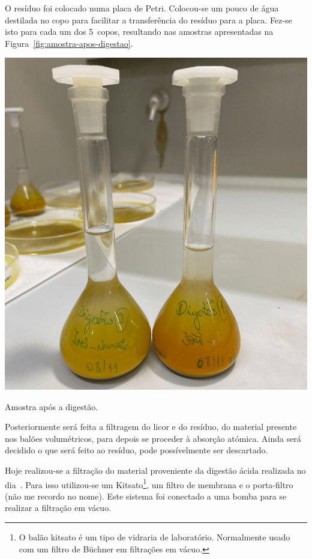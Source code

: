 O resíduo foi colocado numa placa de Petri.
Colocou-se um pouco de água destilada no copo para facilitar a transferência do resíduo para a placa.
Fez-se isto para cada um dos 5~copos, resultando nas amostras apresentadas na Figura~\ref{fig:amostra-apos-digestao}.

\begin{marginfigure}[-1\baselineskip]
    \centering
    \includegraphics[width=0.8\linewidth]{figures/Amostra após Digestão}
    \caption{Amostra após a digestão.}
    \label{fig:amostra-apos-digestao}
\end{marginfigure}

Posteriormente será feita a filtragem do licor e do resíduo, do material presente nos balões volumétricos, para depois se proceder à absorção atómica.
Ainda será decidido o que será feito ao resíduo, pode possívelmente ser descartado.

\hrulefill



Hoje realizou-se a filtração do material proveniente da digestão ácida realizada no dia~.
Para isso utilizou-se um Kitsato\footnote{O balão kitsato é um tipo de vidraria de laboratório. Normalmente usado com um filtro de Büchner em filtrações em vácuo.}, um filtro de membrana e o porta-filtro (não me recordo no nome).
Este sistema foi conectado a uma bomba para se realizar a filtração em vácuo.

